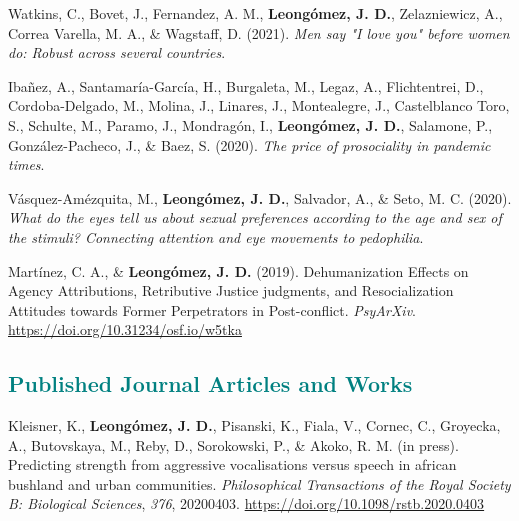 \documentclass[11pt, a4paper]{awesome-cv}
\begin{document}
\begingroup
\setlength{\parindent}{-0.5in}
\setlength{\leftskip}{0.5in}

\hypertarget{refs_working_paper}{}
\leavevmode{}%
Watkins, C., Bovet, J., Fernandez, A. M., \textbf{Leongómez, J. D.},
Zelazniewicz, A., Correa Varella, M. A., \& Wagstaff, D. (2021).
\emph{{Men say "I love you" before women do: Robust across several
countries}}.

\leavevmode{}%
Ibañez, A., Santamaría-García, H., Burgaleta, M., Legaz, A.,
Flichtentrei, D., Cordoba-Delgado, M., Molina, J., Linares, J.,
Montealegre, J., Castelblanco Toro, S., Schulte, M., Paramo, J.,
Mondragón, I., \textbf{Leongómez, J. D.}, Salamone, P.,
González-Pacheco, J., \& Baez, S. (2020). \emph{{The price of
prosociality in pandemic times}}.

\leavevmode{}%
Vásquez-Amézquita, M., \textbf{Leongómez, J. D.}, Salvador, A., \& Seto,
M. C. (2020). \emph{{What do the eyes tell us about sexual preferences
according to the age and sex of the stimuli? Connecting attention and
eye movements to pedophilia}}.

\leavevmode{}%
Martínez, C. A., \& \textbf{Leongómez, J. D.} (2019). Dehumanization
{Effects} on {Agency Attributions}, {Retributive Justice} judgments, and
{Resocialization Attitudes} towards {Former Perpetrators} in
{Post}-conflict. \emph{PsyArXiv}.
\url{https://doi.org/10.31234/osf.io/w5tka}

\endgroup

\hypertarget{section-1}{%
\subsection{\texorpdfstring{\textcolor{teal}{Published Journal Articles and Works}}{}}\label{section-1}}

\begingroup
\setlength{\parindent}{-0.5in}
\setlength{\leftskip}{0.5in}

\hypertarget{refs_journals}{}
\leavevmode{}%
Kleisner, K., \textbf{Leongómez, J. D.}, Pisanski, K., Fiala, V.,
Cornec, C., Groyecka, A., Butovskaya, M., Reby, D., Sorokowski, P., \&
Akoko, R. M. (in press). Predicting strength from aggressive
vocalisations versus speech in african bushland and urban communities.
\emph{Philosophical Transactions of the Royal Society B: Biological
Sciences}, \emph{376}, 20200403.
\url{https://doi.org/10.1098/rstb.2020.0403}
\end{document}
